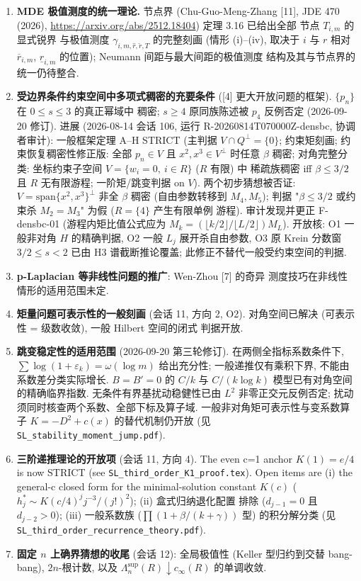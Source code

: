\documentclass[UTF8]{ctexart}
\begin{document}
\begin{enumerate}
		$q\ge0$ (Gan-Zheng-Li-Shao 线 [8]) 与变号权重的最优常数与极值
		结构仍待确定.
	\item \textbf{MDE 极值测度的统一理论.}
		节点界 (Chu-Guo-Meng-Zhang [11], JDE 470 (2026),
		\url{https://arxiv.org/abs/2512.18404}) 定理 3.16 已给出全部
		节点 $T_{i,m}$ 的显式锐界
		与极值测度 $\gamma_{i,m,\hat r,\check r,T}$ 的完整刻画
		(情形 (i)--(iv), 取决于 $i$ 与 $r$ 相对 $\overline r_{i,m}$,
		$\underline r_{i,m}$ 的位置); Neumann 间距与最大间距的极值测度
		结构及其与节点界的统一仍待整合.
	\item \textbf{受边界条件约束空间中多项式稠密的充要条件}
		([4] 更大开放问题的框架). $\{p_n\}$ 在 $0\le s\le3$ 的真正幂域中
		稠密; $s\ge4$ 原同族陈述被 $p_4$ 反例否定 (2026-09-20 修订). 进展 (2026-08-14 会话 106, 运行
		R-20260814T070000Z-densbc, 协调者审计): 一般框架定理 A--H STRICT
		(主判据 $V\cap Q^\perp=\{0\}$; 约束矩刻画; 约束恢复稠密性修正版:
		全部 $p_n\in V$ 且 $x^2,x^3\in V^\perp$ 时任意 $\beta$ 稠密;
		对角完整分类: 坐标约束子空间 $V=\{w_i=0,\ i\in R\}$ ($R$ 有限) 中
		稀疏族稠密 iff $\beta\le3/2$ 且 $R$ 无有限游程; 一阶矩/跳变判据
		on $V$). 两个初步猜想被否证: $V=\mathrm{span}\{x^2,x^3\}^\perp$
		非全 $\beta$ 稠密 (自由参数转移到 $M_4,M_5$); 判据
		"$\beta\le3/2$ 或约束杀 $M_2=M_3$" 为假 ($R=\{4\}$ 产生有限单例
		游程). 审计发现并更正 F-densbc-01 (游程内矩比值公式应为
		$M_k=(\lfloor k/2\rfloor/\lfloor L/2\rfloor)M_L$). 开放核:
		O1 一般非对角 $H$ 的精确判据, O2 一般 $L_j$ 展开杀自由参数,
		O3 原 Krein 分数窗 $3/2\le s<2$ 已由 H3 谱截断推论覆盖; 此修正不替代一般受约束空间的判据.
	\item \textbf{p-Laplacian 等非线性问题的推广}: Wen-Zhou [7] 的奇异
		测度技巧在非线性情形的适用范围未定.
	\item \textbf{矩量问题可表示性的一般刻画} (会话 11, 方向 2, O2).
		对角空间已解决 (可表示性 = 级数收敛), 一般 Hilbert 空间的闭式
		判据开放.
	\item \textbf{跳变稳定性的适用范围} (2026-09-20 第三轮修订).
		在两侧全指标系数条件下, $\sum\log(1+\varepsilon_k)=\omega(\log m)$
		给出充分性; 一般递推仅有乘积下界, 不能由系数差分类实际增长.
		$B=B'=0$ 的 $C/k$ 与 $C/(k\log k)$ 模型已有对角空间的精确临界指数.
		无条件有界基扰动稳健性已由 $L^2$ 非零正交元反例否定;
		扰动须同时核查两个系数、全部下标及算子域.
		一般非对角矩可表示性与变系数算子 $K=-D^2+c(x)$ 的替代机制仍开放
		(见 \texttt{SL\_stability\_moment\_jump.pdf}).
	\item \textbf{三阶递推理论的开放项} (会话 11, 方向 4).
		The even c=1 anchor $K(1)=e/4$ is now STRICT (see
		\texttt{SL\_third\_order\_K1\_proof.tex}). Open items are (i) the
		general-c closed form for the minimal-solution constant $K(c)$
		($h^*_j \sim K(c/4)^j j^{-3}/(j!)^2$); (ii) 盒式归纳退化配置
		排除 ($d_{j-1}=0$ 且 $d_{j-2}>0$); (iii) 一般系数族
		($\prod(1+\beta/(k+\gamma))$ 型) 的积分解分类
		(见 \texttt{SL\_third\_order\_recurrence\_theory.pdf}).
	\item \textbf{固定 $n$ 上确界猜想的收尾} (会话 12): 全局极值性
		(Keller 型归约到交替 bang-bang), $2n$-根计数, 以及
		$\Lambda_n^{\sup}(R)\downarrow c_\infty(R)$ 的单调收敛.
\end{enumerate}
\end{document}
